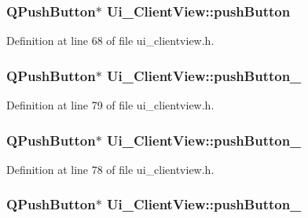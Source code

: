 \subsubsection[{push\+Button}]{\setlength{\rightskip}{0pt plus 5cm}Q\+Push\+Button$\ast$ Ui\+\_\+\+Client\+View\+::push\+Button}\label{class_ui___client_view_ab0bc490a387f6e96e63bc12e2994fd13}


Definition at line 68 of file ui\+\_\+clientview.\+h.

\hypertarget{class_ui___client_view_af081e4b32fc67ba9c0244bea3c47fc00}{}
\subsubsection[{push\+Button\+\_\+2}]{\setlength{\rightskip}{0pt plus 5cm}Q\+Push\+Button$\ast$ Ui\+\_\+\+Client\+View\+::push\+Button\+\_}\label{class_ui___client_view_af081e4b32fc67ba9c0244bea3c47fc00}


Definition at line 79 of file ui\+\_\+clientview.\+h.

\hypertarget{class_ui___client_view_a343d0ec185fc44de1d6da83f943cb90f}{}
\subsubsection[{push\+Button\+\_\+3}]{\setlength{\rightskip}{0pt plus 5cm}Q\+Push\+Button$\ast$ Ui\+\_\+\+Client\+View\+::push\+Button\+\_}\label{class_ui___client_view_a343d0ec185fc44de1d6da83f943cb90f}


Definition at line 78 of file ui\+\_\+clientview.\+h.

\hypertarget{class_ui___client_view_abd60dd3bf35fb58cfc7a56dc620bb86d}{}
\subsubsection[{push\+Button\+\_\+4}]{\setlength{\rightskip}{0pt plus 5cm}Q\+Push\+Button$\ast$ Ui\+\_\+\+Client\+View\+::push\+Button\+\_}\label{class_ui___client_view_abd60dd3bf35fb58cfc7a56dc620bb86d}


